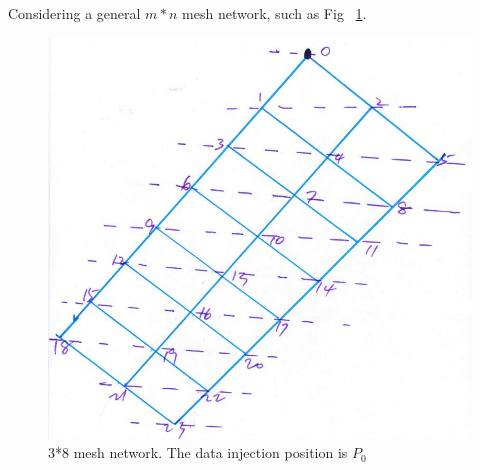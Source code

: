 Considering a general $m*n$ mesh network,  such as Fig ~\ref{fig:3t8}.  

\begin{figure}[!ht]
\centering
\includegraphics[width=0.55\columnwidth]{figure/3t8.JPG}
\caption{3*8 mesh network.  The data injection position is $P_{0}$}
\label{fig:3t8}
\end{figure}

